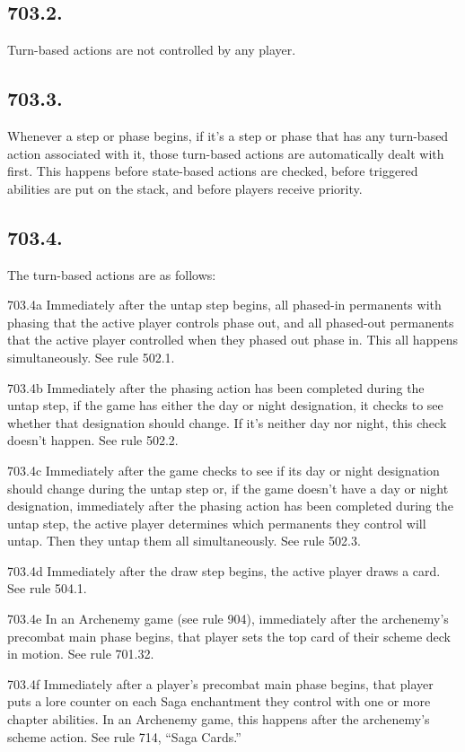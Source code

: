 \subsection*{703.2.}
Turn-based actions are not controlled by any player.

\subsection*{703.3.}
Whenever a step or phase begins, if it’s a step or phase that has any turn-based action associated with it, those turn-based actions are automatically dealt with first. This happens before state-based actions are checked, before triggered abilities are put on the stack, and before players receive priority.

\subsection*{703.4.}
The turn-based actions are as follows:

703.4a Immediately after the untap step begins, all phased-in permanents with phasing that the active player controls phase out, and all phased-out permanents that the active player controlled when they phased out phase in. This all happens simultaneously. See rule 502.1.

703.4b Immediately after the phasing action has been completed during the untap step, if the game has either the day or night designation, it checks to see whether that designation should change. If it’s neither day nor night, this check doesn’t happen. See rule 502.2.

703.4c Immediately after the game checks to see if its day or night designation should change during the untap step or, if the game doesn’t have a day or night designation, immediately after the phasing action has been completed during the untap step, the active player determines which permanents they control will untap. Then they untap them all simultaneously. See rule 502.3.

703.4d Immediately after the draw step begins, the active player draws a card. See rule 504.1.

703.4e In an Archenemy game (see rule 904), immediately after the archenemy’s precombat main phase begins, that player sets the top card of their scheme deck in motion. See rule 701.32.

703.4f Immediately after a player’s precombat main phase begins, that player puts a lore counter on each Saga enchantment they control with one or more chapter abilities. In an Archenemy game, this happens after the archenemy’s scheme action. See rule 714, “Saga Cards.”

